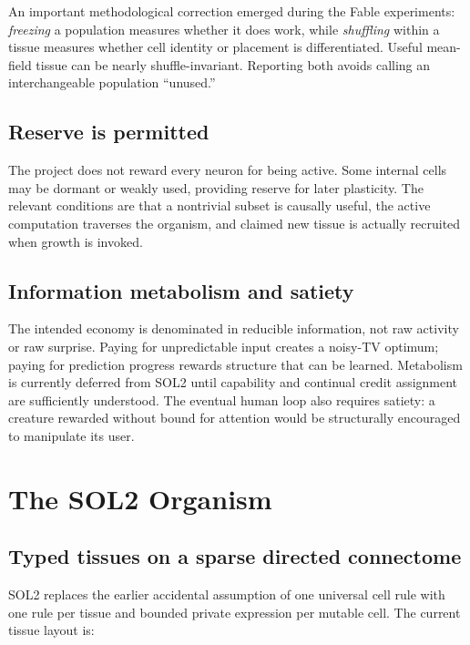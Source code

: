\documentclass[11pt]{article}
\newcommand{\soltwo}{\textsf{SOL2}}
\begin{document}
An important methodological correction emerged during the Fable experiments:
\emph{freezing} a population measures whether it does work, while \emph{shuffling}
within a tissue measures whether cell identity or placement is differentiated. Useful
mean-field tissue can be nearly shuffle-invariant. Reporting both avoids calling an
interchangeable population ``unused.''

\subsection{Reserve is permitted}

The project does not reward every neuron for being active. Some internal cells may be
dormant or weakly used, providing reserve for later plasticity. The relevant conditions
are that a nontrivial subset is causally useful, the active computation traverses the
organism, and claimed new tissue is actually recruited when growth is invoked.

\subsection{Information metabolism and satiety}

The intended economy is denominated in reducible information, not raw activity or raw
surprise. Paying for unpredictable input creates a noisy-TV optimum; paying for
prediction progress rewards structure that can be learned. Metabolism is currently
deferred from \soltwo{} until capability and continual credit assignment are sufficiently
understood. The eventual human loop also requires satiety: a creature rewarded without
bound for attention would be structurally encouraged to manipulate its user.

\section{The SOL2 Organism}

\subsection{Typed tissues on a sparse directed connectome}

\soltwo{} replaces the earlier accidental assumption of one universal cell rule with
one rule per tissue and bounded private expression per mutable cell. The current tissue
layout is:
\end{document}
